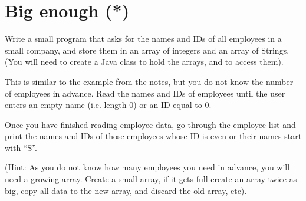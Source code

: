 \documentclass{article}
\begin{document}





\section{Big enough (*)}
\label{sec:big-enough}

Write a small program that asks for the names and IDs of all employees
in a small company, and store them in an array of integers and an
array of Strings. (You will need to create a Java class to hold the
arrays, and to access them). 

This is similar to the example from the notes, but you do not know the
number of employees in advance. Read the names and IDs of employees
until the user enters an empty name (i.e. length 0) or an ID equal to
0.

Once you have finished reading employee data, go through the employee
list and print the names and IDs of
those employees whose ID is even or their names start with ``S''. 

(Hint: As you do not know how many employees you need in advance, you
will need a growing array. Create a small array, if it gets full
create an array twice as big, copy all data to the new array, and
discard the old array, etc).
\end{document}
